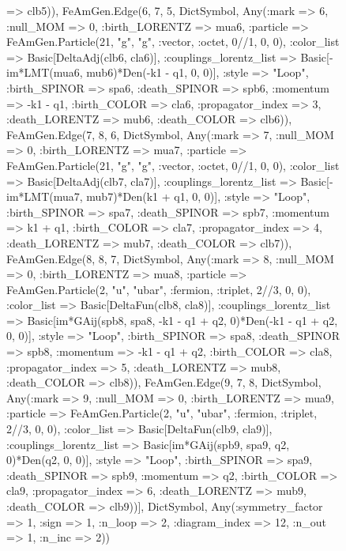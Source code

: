 \documentclass{revtex4}
\begin{document}
\begin{figure}[!htb]
\begin{center}
{=> clb5)), FeAmGen.Edge(6, 7, 5, Dict{Symbol, Any}(:mark => 6, :null_MOM => 0, :birth_LORENTZ => mua6, :particle => FeAmGen.Particle(21, "g", "g", :vector, :octet, 0//1, 0, 0), :color_list => Basic[DeltaAdj(clb6, cla6)], :couplings_lorentz_list => Basic[-im*LMT(mua6, mub6)*Den(-k1 - q1, 0, 0)], :style => "Loop", :birth_SPINOR => spa6, :death_SPINOR => spb6, :momentum => -k1 - q1, :birth_COLOR => cla6, :propagator_index => 3, :death_LORENTZ => mub6, :death_COLOR => clb6)), FeAmGen.Edge(7, 8, 6, Dict{Symbol, Any}(:mark => 7, :null_MOM => 0, :birth_LORENTZ => mua7, :particle => FeAmGen.Particle(21, "g", "g", :vector, :octet, 0//1, 0, 0), :color_list => Basic[DeltaAdj(clb7, cla7)], :couplings_lorentz_list => Basic[-im*LMT(mua7, mub7)*Den(k1 + q1, 0, 0)], :style => "Loop", :birth_SPINOR => spa7, :death_SPINOR => spb7, :momentum => k1 + q1, :birth_COLOR => cla7, :propagator_index => 4, :death_LORENTZ => mub7, :death_COLOR => clb7)), FeAmGen.Edge(8, 8, 7, Dict{Symbol, Any}(:mark => 8, :null_MOM => 0, :birth_LORENTZ => mua8, :particle => FeAmGen.Particle(2, "u", "ubar", :fermion, :triplet, 2//3, 0, 0), :color_list => Basic[DeltaFun(clb8, cla8)], :couplings_lorentz_list => Basic[im*GAij(spb8, spa8, -k1 - q1 + q2, 0)*Den(-k1 - q1 + q2, 0, 0)], :style => "Loop", :birth_SPINOR => spa8, :death_SPINOR => spb8, :momentum => -k1 - q1 + q2, :birth_COLOR => cla8, :propagator_index => 5, :death_LORENTZ => mub8, :death_COLOR => clb8)), FeAmGen.Edge(9, 7, 8, Dict{Symbol, Any}(:mark => 9, :null_MOM => 0, :birth_LORENTZ => mua9, :particle => FeAmGen.Particle(2, "u", "ubar", :fermion, :triplet, 2//3, 0, 0), :color_list => Basic[DeltaFun(clb9, cla9)], :couplings_lorentz_list => Basic[im*GAij(spb9, spa9, q2, 0)*Den(q2, 0, 0)], :style => "Loop", :birth_SPINOR => spa9, :death_SPINOR => spb9, :momentum => q2, :birth_COLOR => cla9, :propagator_index => 6, :death_LORENTZ => mub9, :death_COLOR => clb9))], Dict{Symbol, Any}(:symmetry_factor => 1, :sign => 1, :n_loop => 2, :diagram_index => 12, :n_out => 1, :n_inc => 2)) 
}
\end{center}
\end{figure}
\end{document}
